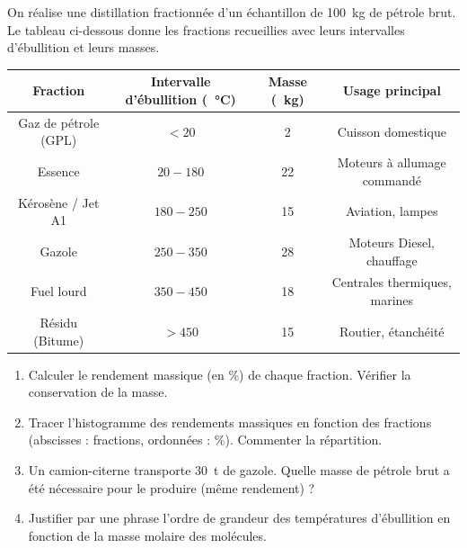 \documentclass[11pt]{article}
\begin{document}
\begin{exercice}
On réalise une distillation fractionnée d'un échantillon de \SI{100}{\kilo\gram} de pétrole brut. Le tableau ci-dessous donne les fractions recueillies avec leurs intervalles d'ébullition et leurs masses.
\begin{center}
\begin{tabular}{|c|c|c|c|}
\hline
Fraction & Intervalle d'ébullition (\SI{}{\celsius}) & Masse (\SI{}{\kilo\gram}) & Usage principal \\
\hline
Gaz de pétrole (GPL) & $< 20$ & 2 & Cuisson domestique \\
Essence & $20 - 180$ & 22 & Moteurs à allumage commandé \\
Kérosène / Jet A1 & $180 - 250$ & 15 & Aviation, lampes \\
Gazole & $250 - 350$ & 28 & Moteurs Diesel, chauffage \\
Fuel lourd & $350 - 450$ & 18 & Centrales thermiques, marines \\
Résidu (Bitume) & $> 450$ & 15 & Routier, étanchéité \\
\hline
\end{tabular}
\end{center}
\begin{enumerate}
    \item Calculer le rendement massique (en \%) de chaque fraction. Vérifier la conservation de la masse.
    \item Tracer l'histogramme des rendements massiques en fonction des fractions (abscisses : fractions, ordonnées : \%). Commenter la répartition.
    \item Un camion-citerne transporte \SI{30}{\tonne} de gazole. Quelle masse de pétrole brut a été nécessaire pour le produire (même rendement) ?
    \item Justifier par une phrase l'ordre de grandeur des températures d'ébullition en fonction de la masse molaire des molécules.
\end{enumerate}
\end{exercice}
\end{document}
